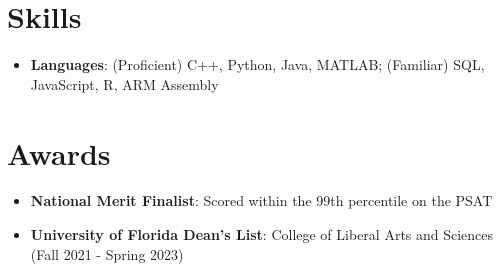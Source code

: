 \documentclass[letterpaper,11pt]{article}
\newcommand{\resumeItemSkills}[2]{
  \item\normalsize{
    \textbf{#1}{: #2 \vspace{-2pt}}
  }
}
\newcommand{\resumeSubItemSkills}[2]{\resumeItemSkills{#1}{#2}\vspace{-4pt}}
\newcommand{\resumeSubHeadingListStartSkillsAwards}{\begin{itemize}[leftmargin=*]}
\newcommand{\resumeSubHeadingListEnd}{\end{itemize}}
\begin{document}
\section{Skills}
 \resumeSubHeadingListStartSkillsAwards
   \resumeSubItemSkills{Languages}{(Proficient) C++, Python, Java, MATLAB; (Familiar) SQL, JavaScript, R, ARM Assembly}
 \resumeSubHeadingListEnd

\section{Awards}
  \resumeSubHeadingListStartSkillsAwards
    \resumeSubItemSkills{National Merit Finalist}
      {Scored within the 99th percentile on the PSAT}
    \resumeSubItemSkills{University of Florida Dean's List}
      {College of Liberal Arts and Sciences (Fall 2021 - Spring 2023)}
  \resumeSubHeadingListEnd
  
\end{document}
